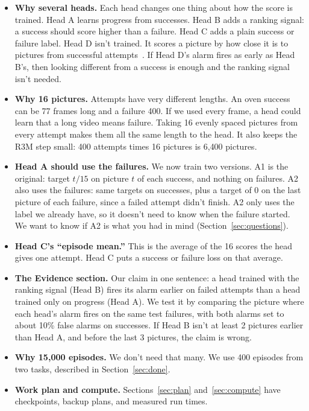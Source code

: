 \documentclass{article}
\begin{document}
\begin{itemize}
\item \textbf{Why several heads.} Each head changes one thing about how the score is trained. Head A learns progress from successes. Head B adds a ranking signal: a success should score higher than a failure. Head C adds a plain success or failure label. Head D isn't trained. It scores a picture by how close it is to pictures from successful attempts~\citep{patchcore}. If Head D's alarm fires as early as Head B's, then looking different from a success is enough and the ranking signal isn't needed.

\item \textbf{Why 16 pictures.} Attempts have very different lengths. An oven success can be 77 frames long and a failure 400. If we used every frame, a head could learn that a long video means failure. Taking 16 evenly spaced pictures from every attempt makes them all the same length to the head. It also keeps the R3M step small: 400 attempts times 16 pictures is 6{,}400 pictures.

\item \textbf{Head A should use the failures.} We now train two versions. A1 is the original: target $t/15$ on picture $t$ of each success, and nothing on failures. A2 also uses the failures: same targets on successes, plus a target of 0 on the last picture of each failure, since a failed attempt didn't finish. A2 only uses the label we already have, so it doesn't need to know when the failure started. We want to know if A2 is what you had in mind (Section~\ref{sec:questions}).

\item \textbf{Head C's ``episode mean.''} This is the average of the 16 scores the head gives one attempt. Head C puts a success or failure loss on that average.

\item \textbf{The Evidence section.} Our claim in one sentence: a head trained with the ranking signal (Head B) fires its alarm earlier on failed attempts than a head trained only on progress (Head A). We test it by comparing the picture where each head's alarm fires on the same test failures, with both alarms set to about 10\% false alarms on successes. If Head B isn't at least 2 pictures earlier than Head A, and before the last 3 pictures, the claim is wrong.

\item \textbf{Why 15{,}000 episodes.} We don't need that many. We use 400 episodes from two tasks, described in Section~\ref{sec:done}.

\item \textbf{Work plan and compute.} Sections~\ref{sec:plan} and~\ref{sec:compute} have checkpoints, backup plans, and measured run times.
\end{itemize}
\end{document}
